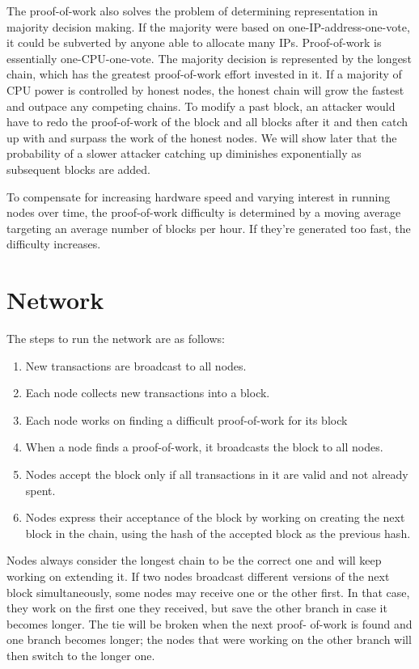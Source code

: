The proof-of-work also solves the problem of determining representation in majority decision making. If the majority were based on one-IP-address-one-vote, it could be subverted by anyone able to allocate many IPs. Proof-of-work is essentially one-CPU-one-vote. The majority decision is represented by the longest chain, which has the greatest proof-of-work effort invested in it. If a majority of CPU power is controlled by honest nodes, the honest chain will grow the fastest and outpace any competing chains. To modify a past block, an attacker would have to redo the proof-of-work of the block and all blocks after it and then catch up with and surpass the work of the honest nodes. We will show later that the probability of a slower attacker catching up diminishes exponentially as subsequent blocks are added.

To compensate for increasing hardware speed and varying interest in running nodes over time, the proof-of-work difficulty is determined by a moving average targeting an average number of blocks per hour. If they're generated too fast, the difficulty increases.

\section{Network}

The steps to run the network are as follows:
\begin{enumerate}
	\item New transactions are broadcast to all nodes.
	\item Each node collects new transactions into a block.
	\item Each node works on finding a difficult proof-of-work for its block
	\item When a node finds a proof-of-work, it broadcasts the block to all nodes.
	\item Nodes accept the block only if all transactions in it are valid and not already spent.
	\item Nodes express their acceptance of the block by working on creating the next block in the chain, using the hash of the accepted block as the previous hash.
\end{enumerate}

Nodes always consider the longest chain to be the correct one and will keep working on extending it. If two nodes broadcast different versions of the next block simultaneously, some nodes may receive one or the other first. In that case, they work on the first one they received, but save the other branch in case it becomes longer. The tie will be broken when the next proof- of-work is found and one branch becomes longer; the nodes that were working on the other branch will then switch to the longer one.


